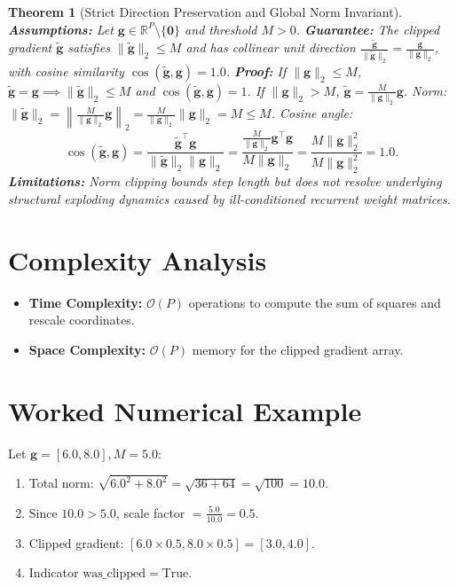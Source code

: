 \documentclass[11pt]{article}
\newtheorem{theorem}{Theorem}
\begin{document}
\begin{theorem}[Strict Direction Preservation and Global Norm Invariant]
\label{thm:direction_preservation}
\textbf{Assumptions:} Let $\mathbf{g} \in \mathbb{R}^P \setminus \{\mathbf{0}\}$ and threshold $M > 0$.
\textbf{Guarantee:} The clipped gradient $\tilde{\mathbf{g}}$ satisfies $\|\tilde{\mathbf{g}}\|_2 \le M$ and has collinear unit direction $\frac{\tilde{\mathbf{g}}}{\|\tilde{\mathbf{g}}\|_2} = \frac{\mathbf{g}}{\|\mathbf{g}\|_2}$, with cosine similarity $\cos(\tilde{\mathbf{g}}, \mathbf{g}) = 1.0$.
\textbf{Proof:}
If $\|\mathbf{g}\|_2 \le M$, $\tilde{\mathbf{g}} = \mathbf{g} \implies \|\tilde{\mathbf{g}}\|_2 \le M$ and $\cos(\tilde{\mathbf{g}}, \mathbf{g}) = 1$.
If $\|\mathbf{g}\|_2 > M$, $\tilde{\mathbf{g}} = \frac{M}{\|\mathbf{g}\|_2} \mathbf{g}$.
Norm: $\|\tilde{\mathbf{g}}\|_2 = \left\|\frac{M}{\|\mathbf{g}\|_2} \mathbf{g}\right\|_2 = \frac{M}{\|\mathbf{g}\|_2} \|\mathbf{g}\|_2 = M \le M$.
Cosine angle:
\begin{equation}
\cos(\tilde{\mathbf{g}}, \mathbf{g}) = \frac{\tilde{\mathbf{g}}^\top \mathbf{g}}{\|\tilde{\mathbf{g}}\|_2 \|\mathbf{g}\|_2} = \frac{\frac{M}{\|\mathbf{g}\|_2} \mathbf{g}^\top \mathbf{g}}{M \|\mathbf{g}\|_2} = \frac{M \|\mathbf{g}\|_2^2}{M \|\mathbf{g}\|_2^2} = 1.0.
\end{equation}
\textbf{Limitations:} Norm clipping bounds step length but does not resolve underlying structural exploding dynamics caused by ill-conditioned recurrent weight matrices.
\end{theorem}

\section{Complexity Analysis}
\label{sec:complexity}

\begin{itemize}
    \item \textbf{Time Complexity:} $\mathcal{O}(P)$ operations to compute the sum of squares and rescale coordinates.
    \item \textbf{Space Complexity:} $\mathcal{O}(P)$ memory for the clipped gradient array.
\end{itemize}

\section{Worked Numerical Example}
\label{sec:worked_example}

Let $\mathbf{g} = [6.0, 8.0], M = 5.0$:
\begin{enumerate}
    \item Total norm: $\sqrt{6.0^2 + 8.0^2} = \sqrt{36 + 64} = \sqrt{100} = 10.0$.
    \item Since $10.0 > 5.0$, scale factor $= \frac{5.0}{10.0} = 0.5$.
    \item Clipped gradient: $[6.0 \times 0.5, 8.0 \times 0.5] = [3.0, 4.0]$.
    \item Indicator $\mathrm{was\_clipped} = \text{True}$.
\end{enumerate}
\end{document}
